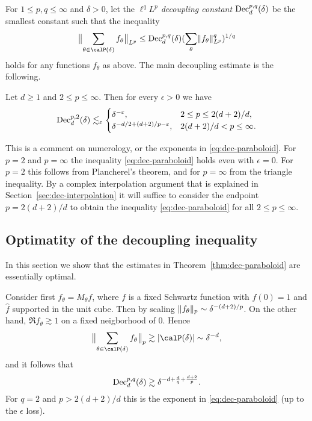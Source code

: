 For $1 \leq p,q \leq \infty$ and $\delta>0$, let the \emph{$\ell^{q}L^{p}$ decoupling constant} $\mathrm{Dec}_{d}^{p,q}(\delta)$ be the smallest constant such that the inequality
\begin{equation}\label{eq:dec-const}
\norm[\big]{\sum_{\theta \in \Part{\delta}} f_{\theta}}_{L^p}
\le
\Dec_{d}^{p,q}(\delta) (\sum_{\theta} \norm{f_{\theta}}_{L^p}^q)^{1/q}
\end{equation}
holds for any functions $f_{\theta}$ as above.
The main decoupling estimate is the following.
\begin{theorem}[{\cite{MR3374964}}]\label{thm:dec-paraboloid}
Let $d \geq 1$ and $2 \leq p \leq \infty$.
Then for every $\epsilon>0$ we have
\begin{equation}\label{eq:dec-paraboloid}
\mathrm{Dec}_{d}^{p,2}(\delta)
\lesssim_{\varepsilon}
\begin{cases}
\delta^{-\varepsilon}, & 2 \leq p \leq 2(d+2)/d,\\
\delta^{-d/2+(d+2)/p-\varepsilon}, & 2(d+2)/d < p \leq \infty.
\end{cases}
\end{equation}
\end{theorem}
\begin{remark}
This is a comment on numerology, or the exponents in \eqref{eq:dec-paraboloid}.
For $p=2$ and $p=\infty$ the inequality \eqref{eq:dec-paraboloid} holds even with $\epsilon = 0$.
For $p=2$ this follows from Plancherel's theorem, and for $p=\infty$ from the triangle inequality.
By a complex interpolation argument that is explained in Section~\ref{sec:dec-interpolation} it will suffice to consider the endpoint $p=2(d+2)/d$ to obtain the inequality \eqref{eq:dec-paraboloid} for all $2 \leq p \leq \infty$.
\end{remark}


\subsection{Optimatity of the decoupling inequality}\label{sec:sharpness}
In this section we show that the estimates in Theorem~\ref{thm:dec-paraboloid} are essentially optimal.

\begin{example}
Consider first $f_{\theta} = M_{\theta} f$, where $f$ is a fixed Schwartz function with $f(0)=1$ and $\hat{f}$ supported in the unit cube.
Then by scaling $\lVert f_{\theta}\rVert_{p} \sim \delta^{-(d+2)/p}$.
On the other hand, $\Re f_{\theta} \gtrsim 1$ on a fixed neigborhood of $0$.
Hence
\[
\norm[\big]{ \sum_{\theta \in \Part{\delta}} f_{\theta} }_{p} \gtrsim \abs{\Part{\delta}} \sim \delta^{-d},
\]
and it follows that
\[
\mathrm{Dec}_{d}^{p,q}(\delta) \gtrsim \delta^{-d+\frac{d}{q}+\frac{d+2}{p}}.
\]
For $q=2$ and $p>2(d+2)/d$ this is the exponent in \eqref{eq:dec-paraboloid} (up to the $\epsilon$ loss).
\end{example}

